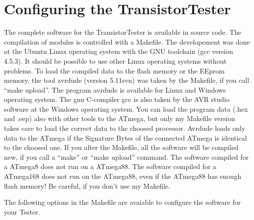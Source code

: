 \chapter{Configuring the TransistorTester}
\label{sec:config}
The complete software for the TransistorTester is available in source code.
The compilation of modules is controlled with a Makefile. The developement was done
at the Ubuntu Linux operating system with the GNU toolchain (gcc version 4.5.3).
It should be possible to use other Linux operating systems without problems.
To load the compiled data to the flash memory or
the EEprom memory, the tool avrdude (version 5.11svn) was taken by the Makefile, if you call ``make upload''.
 The program avrdude is available for Linux and Windows operating system.
The gnu C-compiler gcc is also taken by the AVR studio software
at the Windows operating system.
You can load the program data (.hex and .eep) also with other tools to the ATmega,
but only my Makefile version takes care to load the correct data to the choosed processor.
Avrdude loads only data to the ATmega if the Signature Bytes of the connected ATmega is
identical to the choosed one. 
If you alter the Makefile, all the software will be compiled new, if you call a ``make'' or
``make upload'' command. The software compiled for a ATmega8 does not run on a ATmega88.
The software compiled for a ATmega168 does not run on the ATmega88, even if the ATmega88 has enough flash memory! 
Be careful, if you don't use my Makefile.


The following options in the Makefile are avaiable to configure the software for your Tester.

